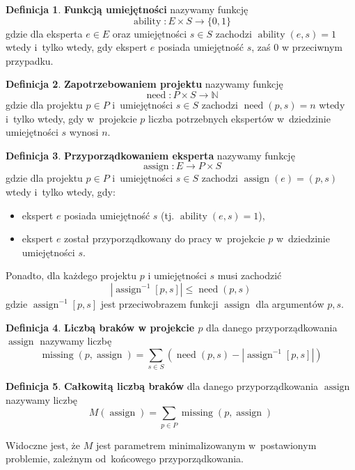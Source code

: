 \documentclass[12pt,a4paper]{article}
\theoremstyle{definition}
\newtheorem{defn}{Definicja}
\DeclareMathOperator{\ability}{ability}
\DeclareMathOperator{\need}{need}
\DeclareMathOperator{\assign}{assign}
\DeclareMathOperator{\missing}{missing}
\begin{document}
\begin{defn}
\textbf{Funkcją umiejętności} nazywamy funkcję
$$ \ability : E \times S \to \{ 0,1 \} $$
gdzie dla eksperta $e \in E$ oraz umiejętności $s \in S$ zachodzi
$\ability(e, s) = 1$ wtedy i~tylko wtedy, gdy ekspert $e$ posiada umiejętność
$s$, zaś 0 w przeciwnym przypadku.
\end{defn}

\begin{defn}
\textbf{Zapotrzebowaniem projektu} nazywamy funkcję
$$ \need : P \times S \to \mathbb{N} $$
gdzie dla projektu $p \in P$ i~umiejętności $s \in S$ zachodzi $\need(p, s) = n$
wtedy i~tylko wtedy, gdy w~projekcie $p$ liczba potrzebnych ekspertów
w~dziedzinie umiejętności $s$ wynosi $n$.
\end{defn}

\begin{defn}
\textbf{Przyporządkowaniem eksperta} nazywamy funkcję
$$ \assign : E \to P \times S $$
gdzie dla projektu $p \in P$ i~umiejętności $s \in S$ zachodzi
$\assign(e) = (p,s)$ wtedy i~tylko wtedy, gdy:
\begin{itemize}
	\item ekspert $e$ posiada umiejętność $s$ (tj. $\ability(e,s) = 1$),
	\item ekspert $e$ został przyporządkowany do pracy w~projekcie $p$
	w~dziedzinie umiejętności $s$.
\end{itemize}
Ponadto, dla każdego projektu $p$ i umiejętności $s$ musi zachodzić
$$ \left| \assign^{-1}[p,s] \right| \leq \need(p,s) $$
gdzie $\assign^{-1}[p,s]$ jest przeciwobrazem funkcji $\assign$ dla argumentów
$p,s$.
\end{defn}

\begin{defn}
\label{defn:missing}
\textbf{Liczbą braków w projekcie $p$} dla danego przyporządkowania $\assign$
nazywamy liczbę
$$ \missing(p,\assign) = \sum_{s \in S} \left( \need(p,s) -
\left| \assign^{-1}[p,s] \right| \right) $$
\end{defn}

\begin{defn}
\textbf{Całkowitą liczbą braków} dla danego przyporządkowania $\assign$ nazywamy
liczbę
$$ M(\assign) = \sum_{p \in P} \missing(p, \assign) $$
\end{defn}

\noindent
Widoczne jest, że $M$ jest parametrem minimalizowanym w~postawionym problemie,
zależnym od~końcowego przyporządkowania.\\
\end{document}
